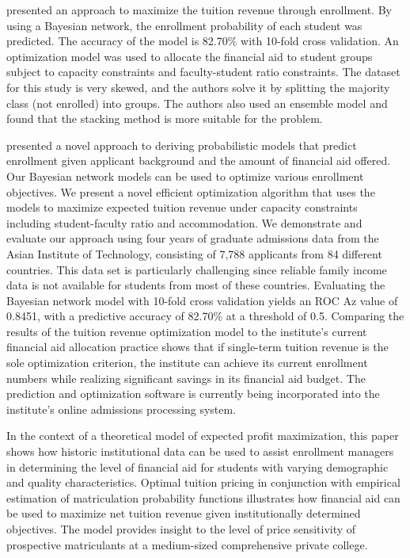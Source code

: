 \documentclass[12pt,english]{report}
\begin{document}
\citet{Thanh2007} presented an approach to maximize the tuition revenue through
enrollment. By using a Bayesian network, the enrollment probability of each
student was predicted. The accuracy of the model is 82.70\% with 10-fold cross
validation. An optimization model was used to allocate the financial aid to
student groups subject to capacity constraints and faculty-student ratio
constraints. The dataset for this study is very skewed, and the authors solve
it by splitting the majority class (not enrolled) into groups. The authors also
used an ensemble model and found that the stacking method is more suitable for
the problem.

\citet{Thanh2007}  presented a novel approach to deriving probabilistic models
that predict enrollment given applicant background and the amount of financial
aid offered. Our Bayesian network models can be used to optimize various
enrollment objectives. We present a novel efficient optimization algorithm that
uses the models to maximize expected tuition revenue under capacity constraints
including student-faculty ratio and accommodation. We demonstrate and evaluate
our approach using four years of graduate admissions data from the Asian
Institute of Technology, consisting of 7,788 applicants from 84 different
countries. This data set is particularly challenging since reliable family
income data is not available for students from most of these countries.
Evaluating the Bayesian network model with 10-fold cross validation yields an
ROC Az value of 0.8451, with a predictive accuracy of 82.70\% at a threshold of
0.5. Comparing the results of the tuition revenue optimization model to the
institute's current financial aid allocation practice shows that if single-term
tuition revenue is the sole optimization criterion, the institute can achieve
its current enrollment numbers while realizing significant savings in its
financial aid budget. The prediction and optimization software is currently
being incorporated into the institute's online admissions processing system.

\citet{Bosshardt2010} In the context of a theoretical model of expected profit
maximization, this paper shows how historic institutional data can be used to
assist enrollment managers in determining the level of financial aid for
students with varying demographic and quality characteristics. Optimal tuition
pricing in conjunction with empirical estimation of matriculation probability
functions illustrates how financial aid can be used to maximize net tuition
revenue given institutionally determined objectives. The model provides insight
to the level of price sensitivity of prospective matriculants at a medium-sized
comprehensive private college.
\end{document}
